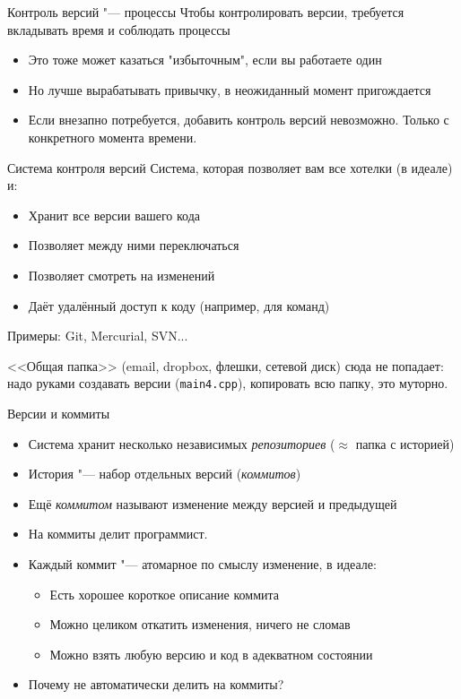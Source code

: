 \begin{frame}[t]{Контроль версий "--- процессы}
Чтобы контролировать версии, требуется вкладывать время и соблюдать процессы
\begin{itemize}
  \item Это тоже может казаться "избыточным", если вы работаете один
  \item Но лучше вырабатывать привычку, в неожиданный момент пригождается
  \item Если внезапно потребуется, добавить контроль версий невозможно. Только с конкретного момента времени.
\end{itemize}
\end{frame}

\begin{frame}[t,fragile]{Система контроля версий}
Система, которая позволяет вам все хотелки (в идеале) и:
\begin{itemize}
\item Хранит все версии вашего кода
\item Позволяет между ними переключаться
\item Позволяет смотреть на изменений
\item Даёт удалённый доступ к коду (например, для команд)
\end{itemize}
Примеры: Git, Mercurial, SVN...

<<Общая папка>> (email, dropbox, флешки, сетевой диск) сюда не попадает:
надо руками создавать версии (\verb~main4.cpp~), копировать всю папку, это муторно. 
\end{frame}

\begin{frame}[t]{Версии и коммиты}
\begin{itemize}
\item Система хранит несколько независимых \textit{репозиториев} ($\approx$ папка с историей)
\item История "--- набор отдельных версий (\textit{коммитов})
\item Ещё \textit{коммитом} называют изменение между версией и предыдущей
\item На коммиты делит программист.
\item Каждый коммит "--- атомарное по смыслу изменение, в идеале:
	\begin{itemize}
	\item Есть хорошее короткое описание коммита
	\item Можно целиком откатить изменения, ничего не сломав
	\item Можно взять любую версию и код в адекватном состоянии
	\end{itemize}
\item Почему не автоматически делить на коммиты?
\end{itemize}
\end{frame}

